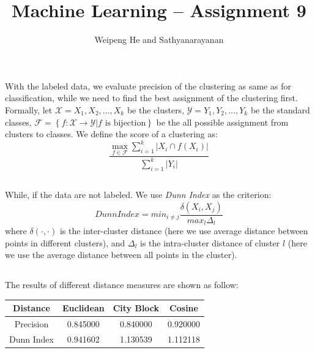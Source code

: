 \documentclass{article}[11pt]
\title{Machine Learning -- Assignment 9}
\author{Weipeng He and Sathyanarayanan}
\begin{document}
\maketitle

\section{}
\subsection{}
With the labeled data, we evaluate precision of the clustering as same as for classification, while we need to find the best assignment of the clustering first. Formally, let $\mathcal{X} = {X_1, X_2, \dots, X_k}$ be the clusters, $\mathcal{Y} = {Y_1, Y_2, \dots, Y_k}$ be the standard classes, $\mathcal{F} = \left\{f:\mathcal{X}\rightarrow\mathcal{Y} | f \text{ is bijection}\right\}$ be the all possible assignment from clusters to classes. We define the score of a clustering as:
\[ \frac{\max_{f \in \mathcal{F}} \sum_{i=1}^{k} \left| X_i \cap f(X_i) \right|}{\sum_{i=1}^{k} \left| Y_i \right|}  \]

\subsection{}
While, if the data are not labeled. We use \emph{Dunn Index} as the criterion:
\[ DunnIndex = min_{i \neq j} \frac{\delta(X_i,X_j)}{max_{l} \Delta_l} \]
where $\delta(\cdot,\cdot)$ is the inter-cluster distance (here we use average distance between points in different clusters), and $\Delta_l$ is the intra-cluster distance of cluster $l$ (here we use the average distance between all points in the cluster).

\subsection{}
The results of different distance measures are shown as follow: 
\begin{center}
\begin{tabular}[h]{c|ccc}
  \hline
  Distance & Euclidean & City Block & Cosine \\ \hline
  Precision &  0.845000 & 0.840000 & 0.920000 \\
  Dunn Index & 0.941602 & 1.130539 & 1.112118 \\ \hline
\end{tabular}
\end{center}
\end{document}
